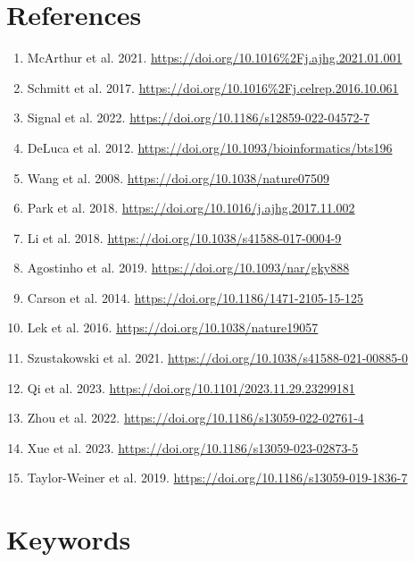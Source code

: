 \documentclass[12pt]{article}
\begin{document}
\section*{References}
\begin{enumerate}
  \item McArthur et al. 2021. \url{https://doi.org/10.1016%2Fj.ajhg.2021.01.001}
  \item Schmitt et al. 2017. \url{https://doi.org/10.1016%2Fj.celrep.2016.10.061}
  \item Signal et al. 2022. \url{https://doi.org/10.1186/s12859-022-04572-7}
  \item DeLuca et al. 2012. \url{https://doi.org/10.1093/bioinformatics/bts196}
  \item Wang et al. 2008. \url{https://doi.org/10.1038/nature07509}
  \item Park et al. 2018. \url{https://doi.org/10.1016/j.ajhg.2017.11.002}
  \item Li et al. 2018. \url{https://doi.org/10.1038/s41588-017-0004-9}
  \item Agostinho et al. 2019. \url{https://doi.org/10.1093/nar/gky888}
  \item Carson et al. 2014. \url{https://doi.org/10.1186/1471-2105-15-125}
  \item Lek et al. 2016. \url{https://doi.org/10.1038/nature19057}
  \item Szustakowski et al. 2021. \url{https://doi.org/10.1038/s41588-021-00885-0}
  \item Qi et al. 2023. \url{https://doi.org/10.1101/2023.11.29.23299181}
  \item Zhou et al. 2022. \url{https://doi.org/10.1186/s13059-022-02761-4}
  \item Xue et al. 2023. \url{https://doi.org/10.1186/s13059-023-02873-5}
  \item Taylor-Weiner et al. 2019. \url{https://doi.org/10.1186/s13059-019-1836-7}
\end{enumerate}

\section*{Keywords}
\end{document}
